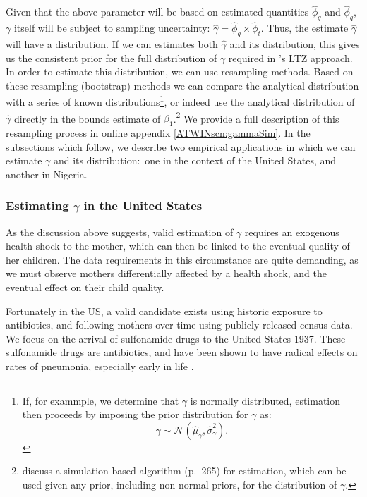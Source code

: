 \documentclass[subeqn]{article}
\begin{document}
\begin{spacing}{1.4}
Given that the above parameter will be based on estimated quantities $\hat\phi_q$
and $\hat\phi_q$, $\gamma$ itself will be subject to sampling uncertainty:
$\hat\gamma = \hat\phi_q\times \hat\phi_t$.  Thus, the estimate $\hat\gamma$ will
have a distribution.  If we can estimates both $\hat\gamma$ and its distribution,
this gives us the consistent prior for the full distribution of $\gamma$ required
in \citeauthor{Conleyetal2012}'s LTZ approach.  In order to estimate this
distribution, we can use resampling methods.  Based on these resampling (bootstrap)
methods we can compare the analytical distribution with a series of known
distributions\footnote{If, for exammple, we determine that $\gamma$ is normally
  distributed, estimation then proceeds by imposing the prior distribution for
  $\gamma$ as:
  \begin{equation}
    \label{TWINeqn:ltz}
    \gamma \sim \mathcal{N}(\hat\mu_\gamma,\hat\sigma^2_\gamma).
  \end{equation}
}, or indeed use the analytical distribution of $\hat\gamma$ directly in the
bounds estimate of $\beta_1$.\footnote{\citet{Conleyetal2012} discuss a
  simulation-based algorithm (p.\ 265) for estimation, which can be used given
  any prior, including non-normal priors, for the distribution of $\gamma$.}
We provide a full description of this resampling process in online appendix
\ref{ATWINscn:gammaSim}. In the subsections which follow, we describe two
empirical applications in which we can estimate $\gamma$ and its distribution:\
one in the context of the United States, and another in Nigeria.

\subsubsection{Estimating $\gamma$ in the United States}
\label{sscn:USgamma}
As the discussion above suggests, valid estimation of $\gamma$ requires an
exogenous health shock to the mother, which can then be linked to the eventual
quality of her children.  The data requirements in this circumstance are quite
demanding, as we must observe mothers differentially affected by a health shock,
and the eventual effect on their child quality.

Fortunately in the US, a valid candidate exists using historic exposure to
antibiotics, and following mothers over time using publicly released census
data.  We focus on the arrival of sulfonamide drugs to the United States 1937.
These sulfonamide drugs are antibiotics, and have been shown to have radical
effects on rates of pneumonia, especially early in life \citep{Jayachandranetal2010,
  BhalotraVenkataramani2014}.


\end{spacing}
\end{document}
